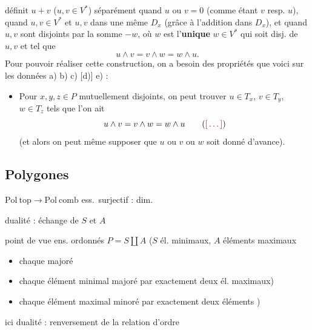 \documentclass[11pt,a4paper]{article}
\begin{document}
définit $u + v$ ($u, v \in V^{*}$) séparément quand $u$ ou $v = 0$ (comme
étant $v$ resp. $u$), quand $u, v \in V^{*}$ et $u, v$ dans une même $D_x$
(grâce à l'addition dans $D_x$), et quand $u, v$ sont disjoints par la
\struck{\ill{}} somme $-w$, où $w$ est l'\textbf{unique} $w \in V^{*}$ qui
soit disj. de $u, v$ et tel que
\[
  u \wedge v = v \wedge w = w \wedge u .
\]
Pour pouvoir réaliser cette construction, on a besoin des 
propriétés que voici sur les données a) b) c) [d)] e) :
\begin{itemize}
  \item[a)] Pour $x, y, z \in P$ mutuellement disjoints, on peut trouver
    $u \in T_x$, $v \in T_y$, $w \in T_z$ tels que l'on ait
    \[
      u \wedge v = v \wedge w = w \wedge u \qquad (\ill{})
    \]
    (et alors on peut même supposer que $u$ ou $v$ ou $w$ \struck{\ill{}} soit
    donné d'avance).
\end{itemize}

\subsection{Polygones}


$\mathrm{Pol}\ \mathrm{top} \longrightarrow \mathrm{Pol}\ \mathrm{comb}$
 ess.\ surjectif : dim. \ill{}

dualité : échange de $S$ et $A$

point de vue ens. ordonnés $P = S \amalg A$
\struck{\ill{}} ($S$ él. minimaux, $A$ éléments maximaux
\begin{itemize}
  \item[] chaque   majoré \ill{}
  \item[] chaque élément minimal majoré  par
    exactement deux él. maximaux)
  \item[] chaque élément maximal minoré par exactement deux éléments
    )
\end{itemize}
ici dualité : renversement de la relation d'ordre
\end{document}
